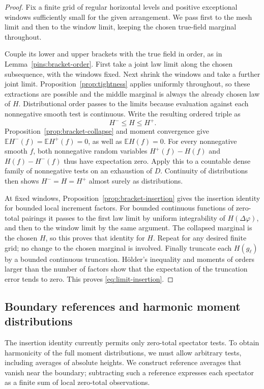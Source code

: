 \documentclass[11pt]{article}
\newcommand{\E}{\mathbb E}
\theoremstyle{definition}
\theoremstyle{remark}
\numberwithin{equation}{section}
\begin{document}
\begin{proof}
Fix a finite grid of regular horizontal levels and positive exceptional
windows sufficiently small for the given arrangement.  We pass first
to the mesh limit and then to the window limit, keeping the chosen
true-field marginal throughout.

Couple its lower and upper brackets with the true field in order,
as in Lemma~\ref{pins:bracket-order}.  First take a joint law limit
along the chosen subsequence, with the windows fixed.  Next shrink
the windows and take a further joint limit.  Proposition~\ref{prop:tightness}
applies uniformly throughout, so these extractions are possible and
the middle marginal is always the already chosen law of \(H\).
Distributional order passes to the limits because evaluation against
each nonnegative smooth test is continuous.  Write the resulting
ordered triple as
\[
       H^-\le H\le H^+.
\]
Proposition~\ref{prop:bracket-collapse} and moment convergence give
\(\E H^-(f)=\E H^+(f)=0\), as well as \(\E H(f)=0\).
For every nonnegative smooth \(f\), both nonnegative random variables
\(H^+(f)-H(f)\) and \(H(f)-H^-(f)\) thus have expectation zero.
Apply this to a countable dense family of nonnegative tests on an
exhaustion of \(D\).  Continuity of distributions then shows
\(H^-=H=H^+\) almost surely as distributions.

At fixed windows, Proposition~\ref{prop:bracket-insertion} gives the
insertion identity for bounded local increment factors.  For bounded
continuous functions of zero-total pairings it passes to the first
law limit by uniform integrability of \(H(\Delta\varphi)\), and then
to the window limit by the same argument.  The collapsed marginal is
the chosen \(H\), so this proves that identity for \(H\).
Repeat for any desired finite grid; no change to the chosen marginal
is involved.  Finally truncate each \(H(g_\ell)\) by a bounded
continuous truncation.  H\"older's inequality and moments of orders
larger than the number of factors show that the expectation of the
truncation error tends to zero.  This proves
\eqref{eq:limit-insertion}.
\end{proof}

\subsection{Boundary references and harmonic moment distributions}

The insertion identity currently permits only zero-total spectator
tests.  To obtain harmonicity of the full moment distributions, we
must allow arbitrary tests, including averages of absolute heights.
We construct reference averages that vanish near the boundary;
subtracting such a reference expresses each spectator as a finite
sum of local zero-total observations.
\end{document}
